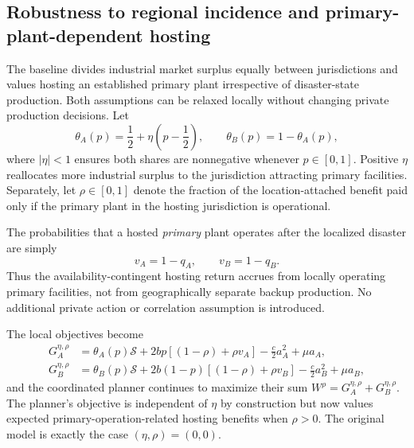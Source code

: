 \subsection{Robustness to regional incidence and primary-plant-dependent hosting}
\label{sec:incidence-robustness}

The baseline divides industrial market surplus equally between
jurisdictions and values hosting an established primary plant
irrespective of disaster-state production. Both assumptions can
be relaxed locally without changing private production decisions.
Let
\begin{equation}
\theta_A(p)=\frac12+\eta\left(p-\frac12\right),
\qquad \theta_B(p)=1-\theta_A(p),
\label{eq:endogenous-incidence}
\end{equation}
where $|\eta|<1$ ensures both shares are nonnegative whenever
$p\in[0,1]$. Positive $\eta$ reallocates more industrial surplus
to the jurisdiction attracting primary facilities. Separately,
let $\rho\in[0,1]$ denote the fraction of the location-attached
benefit paid only if the primary plant in the hosting jurisdiction is operational.

The probabilities that a hosted \emph{primary} plant operates after
the localized disaster are simply
\begin{equation}
v_A=1-q_A,\qquad v_B=1-q_B.
\label{eq:availability-conditional}
\end{equation}
Thus the availability-contingent hosting return accrues from
locally operating primary facilities, not from geographically
separate backup production. No additional private action or
correlation assumption is introduced.

The local objectives become
\begin{align}
G_A^{\eta,\rho}
 &=\theta_A(p)\mathcal S
   +2bp[(1-\rho)+\rho v_A]
   -\frac{c}{2}a_A^2+\mu a_A,\\
G_B^{\eta,\rho}
 &=\theta_B(p)\mathcal S
   +2b(1-p)[(1-\rho)+\rho v_B]
   -\frac{c}{2}a_B^2+\mu a_B,
\label{eq:perturbed-regional-payoffs}
\end{align}
and the coordinated planner continues to maximize their sum
$W^{\rho}=G_A^{\eta,\rho}+G_B^{\eta,\rho}$.
The planner's objective is independent of $\eta$ by construction
but now values expected primary-operation-related hosting benefits
when $\rho>0$. The original model is exactly the case
$(\eta,\rho)=(0,0)$.

